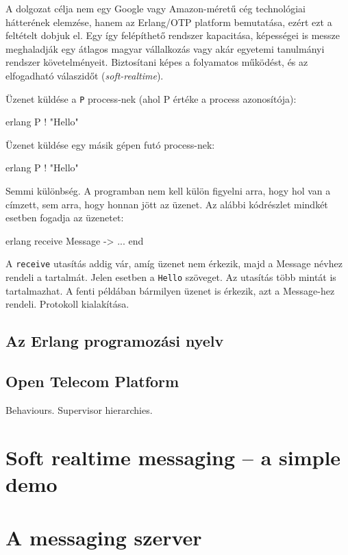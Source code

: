 \documentclass[12pt, a4paper, oneside]{book}
\begin{document}
A dolgozat célja nem egy Google vagy Amazon-méretű cég technológiai hátterének
elemzése, hanem az Erlang/OTP platform bemutatása, ezért ezt a feltételt dobjuk
el. Egy így felépíthető rendszer kapacitása, képességei is messze meghaladják
egy átlagos magyar vállalkozás vagy akár egyetemi tanulmányi rendszer
követelményeit. Biztosítani képes a folyamatos működést, és az elfogadható
válaszidőt (\emph{soft-realtime}).

\newpage
\noindent Üzenet küldése a \texttt{P} process-nek (ahol P értéke a process azonosítója):

\begin{code}{erlang}{}
P ! "Hello"
\end{code}

\noindent Üzenet küldése egy másik gépen futó process-nek:

\begin{code}{erlang}{}
P ! "Hello"
\end{code}

\noindent Semmi különbség. A programban nem kell külön figyelni arra, 
hogy hol van a címzett, sem arra, hogy honnan jött az üzenet. Az alábbi
kódrészlet mindkét esetben fogadja az üzenetet:

\begin{code}{erlang}{}
receive
  Message ->
      ...
end
\end{code}

A \texttt{receive} utasítás addig vár, amíg üzenet nem érkezik, majd a Message
névhez rendeli a tartalmát. Jelen esetben a \texttt{Hello} szöveget. Az utasítás
több mintát is tartalmazhat. A fenti példában bármilyen üzenet is érkezik, azt
a Message-hez rendeli.
Protokoll kialakítása.

\section{Az Erlang programozási nyelv} 
\section{Open Telecom Platform} 
Behaviours. Supervisor hierarchies.  

\chapter{Soft realtime messaging -- a simple demo}

\chapter{A messaging szerver}
\end{document}
